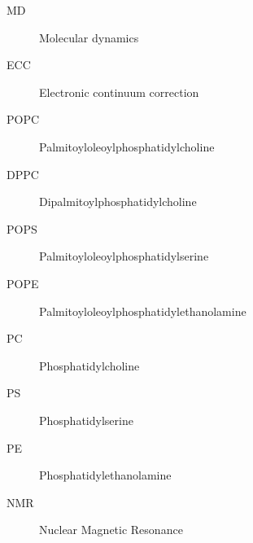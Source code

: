 \documentclass[12pt,a4paper,twoside,openright]{report}
\begin{document}
\newlength{\figwidth}
\setlength{\figwidth}{9 cm} 
\newlength{\figwidthsmall}
\setlength{\figwidthsmall}{6 cm} 
\newlength{\figwidthfull}
\setlength{\figwidthfull}{14 cm} 




\tableofcontents










\listoffigures

\listoftables


\begin{description}   %
\item [MD]   Molecular dynamics
\item [ECC]  Electronic continuum correction
\item [POPC] Palmitoyloleoylphosphatidylcholine
\item [DPPC] Dipalmitoylphosphatidylcholine
\item [POPS] Palmitoyloleoylphosphatidylserine
\item [POPE] Palmitoyloleoylphosphatidylethanolamine
\item [PC]   Phosphatidylcholine
\item [PS]   Phosphatidylserine
\item [PE]   Phosphatidylethanolamine
\item [NMR]  Nuclear Magnetic Resonance
\end{description}

\end{document}
